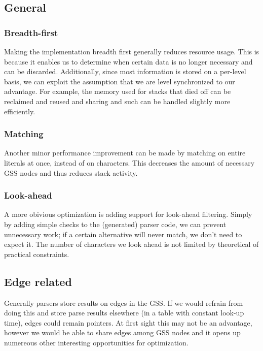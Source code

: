 \documentclass[a4paper,10pt]{article}
\begin{document}
\subsection{General}

\subsubsection{Breadth-first}
Making the implementation breadth first generally reduces resource usage. This is because it enables us to determine when certain data is no longer necessary and can be discarded. Additionally, since most information is stored on a per-level basis, we can exploit the assumption that we are level synchronized to our advantage. For example, the memory used for stacks that died off can be reclaimed and reused and sharing and such can be handled slightly more efficiently.

\subsubsection{Matching}
Another minor performance improvement can be made by matching on entire literals at once, instead of on characters. This decreases the amount of necessary GSS nodes and thus reduces stack activity.

\subsubsection{Look-ahead}
A more obivious optimization is adding support for look-ahead filtering. Simply by adding simple checks to the (generated) parser code, we can prevent unnecessary work; if a certain alternative will never match, we don't need to expect it. The number of characters we look ahead is not limited by theoretical of practical constraints.

\subsection{Edge related}

Generally parsers store results on edges in the GSS. If we would refrain from doing this and store parse results elsewhere (in a table with constant look-up time), edges could remain pointers. At first sight this may not be an advantage, however we would be able to share edges among GSS nodes and it opens up numereous other interesting opportunities for optimization.
\end{document}
